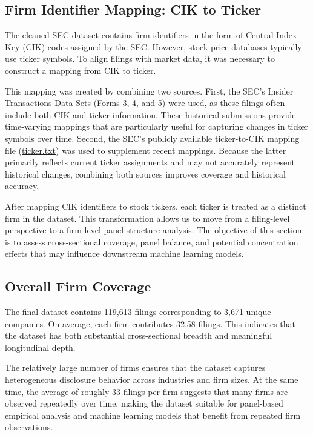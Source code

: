 \subsection{Firm Identifier Mapping: CIK to Ticker}

The cleaned SEC dataset contains firm identifiers in the form of Central Index Key (CIK) codes assigned by the SEC. 
However, stock price databases typically use ticker symbols. 
To align filings with market data, it was necessary to construct a mapping from CIK to ticker.

This mapping was created by combining two sources. 
First, the SEC's Insider Transactions Data Sets (Forms 3, 4, and 5) were used, as these filings often include both CIK and ticker information. 
These historical submissions provide time-varying mappings that are particularly useful for capturing changes in ticker symbols over time. 
Second, the SEC's publicly available ticker-to-CIK mapping file (\href{https://www.sec.gov/include/ticker.txt}{ticker.txt}) was used to supplement recent mappings. 
Because the latter primarily reflects current ticker assignments and may not accurately represent historical changes, combining both sources improves coverage and historical accuracy.

After mapping CIK identifiers to stock tickers, each ticker is treated as a distinct firm in the dataset. This transformation allows us to move from a filing-level perspective to a firm-level panel structure analysis. The objective of this section is to assess cross-sectional coverage, panel balance, and potential concentration effects that may influence downstream machine learning models.

\subsection*{Overall Firm Coverage}

The final dataset contains 119,613 filings corresponding to 3,671 unique companies. On average, each firm contributes 32.58 filings. This indicates that the dataset has both substantial cross-sectional breadth and meaningful longitudinal depth.

The relatively large number of firms ensures that the dataset captures heterogeneous disclosure behavior across industries and firm sizes. At the same time, the average of roughly 33 filings per firm suggests that many firms are observed repeatedly over time, making the dataset suitable for panel-based empirical analysis and machine learning models that benefit from repeated firm observations.

